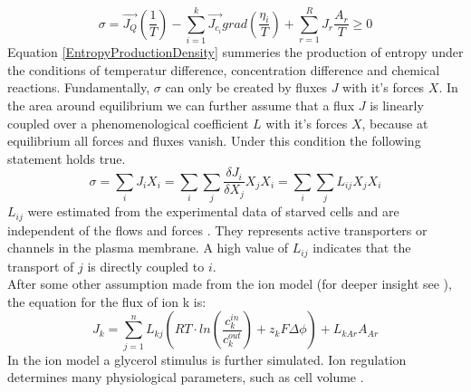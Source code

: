 \begin{equation}\label{EntropyProductionDensity}
	\sigma = \vec{J_Q}\left(\frac{1}{T}\right) - \sum_{i=1}^{k}\vec{J_{c_i}}grad \left(\frac{\eta _i}{T}\right) + \sum_{r=1}^{R}J_r \frac{A_r}{T} \geq 0
\end{equation}
Equation \ref{EntropyProductionDensity} summeries the production of entropy under the conditions of temperatur difference, concentration difference and chemical reactions.
Fundamentally, $\sigma$ can only be created by fluxes $J$ with it’s forces $X$. In the area around equilibrium we can further assume that a flux $J$ is linearly coupled over a phenomenological coefficient $L$ with it’s forces $X$, because at equilibrium all forces and fluxes vanish. Under this condition the following statement holds true.
\begin{equation}\label{stoeachimetricCoeff}
	\sigma = \sum_{i}J_i X_i = \sum_{i}\sum_{j} \frac{\delta J_i}{\delta X_j}X_j X_i= \sum_{i}\sum_{j}L_{ij}X_j X_i
\end{equation}
$L_{ij}$ were estimated from the experimental data of starved cells and are independent of the flows and forces \cite{Gerber_2016}. They represents active transporters or channels in the plasma membrane. A high value of $L_{ij}$ indicates that the transport of $j$ is directly coupled to $i$.\\
After some other assumption made from the ion model (for deeper insight see \cite{Gerber_2016}), the equation for the flux of ion k is:
\begin{equation*}
J_k = \sum_{j=1}^n L_{kj}(RT\cdot ln\left(\frac{c_k^{in}}{c_k^{out}}\right) + z_kF\Delta \phi ) + L_{kAr}A_{Ar}
\end{equation*}
In the ion model a glycerol stimulus is further simulated. Ion regulation determines many physiological parameters, such as cell volume \cite{Ke_2013}.\\\\


